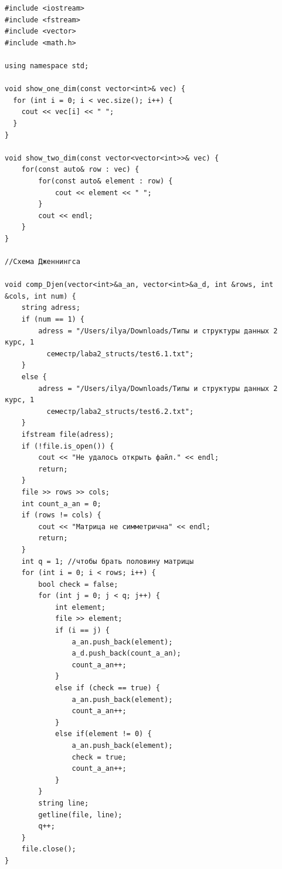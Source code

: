 \documentclass[12pt, a4paper]{article}
\begin{document}
\begin{lstlisting}[caption={Исходный код}, label={lst:label1}]
#include <iostream>
#include <fstream>
#include <vector>
#include <math.h>

using namespace std;

void show_one_dim(const vector<int>& vec) {
  for (int i = 0; i < vec.size(); i++) {
    cout << vec[i] << " ";
  }
}

void show_two_dim(const vector<vector<int>>& vec) {
    for(const auto& row : vec) {
        for(const auto& element : row) {
            cout << element << " ";
        }
        cout << endl;
    }
}

//Схема Дженнингса

void comp_Djen(vector<int>&a_an, vector<int>&a_d, int &rows, int &cols, int num) {
    string adress;
    if (num == 1) {
        adress = "/Users/ilya/Downloads/Типы и структуры данных 2 курс, 1 
          семестр/laba2_structs/test6.1.txt";
    }
    else {
        adress = "/Users/ilya/Downloads/Типы и структуры данных 2 курс, 1 
          семестр/laba2_structs/test6.2.txt";
    }
    ifstream file(adress);
    if (!file.is_open()) {
        cout << "Не удалось открыть файл." << endl;
        return;
    }
    file >> rows >> cols;
    int count_a_an = 0;
    if (rows != cols) {
        cout << "Матрица не симметрична" << endl;
        return;
    }
    int q = 1; //чтобы брать половину матрицы
    for (int i = 0; i < rows; i++) {
        bool check = false;
        for (int j = 0; j < q; j++) {
            int element;
            file >> element;
            if (i == j) {
                a_an.push_back(element);
                a_d.push_back(count_a_an);
                count_a_an++;
            }
            else if (check == true) {
                a_an.push_back(element);
                count_a_an++;
            }
            else if(element != 0) {
                a_an.push_back(element);
                check = true;
                count_a_an++;
            }
        }
        string line;
        getline(file, line);
        q++;
    }
    file.close();
}


\end{lstlisting}
\end{document}
